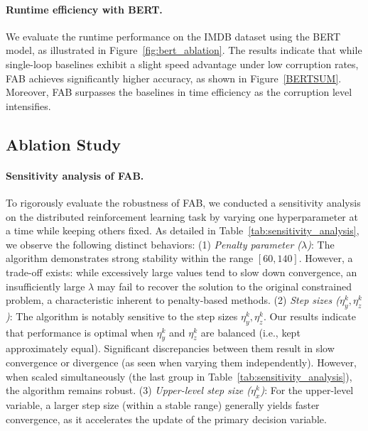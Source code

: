 \documentclass{article}
\theoremstyle{plain}
\theoremstyle{definition}
\theoremstyle{remark}
\begin{document}
\paragraph{Runtime efficiency with BERT.}
We evaluate the runtime performance on the IMDB dataset using the BERT model, as illustrated in Figure~\ref{fig:bert_ablation}.
The results indicate that while single-loop baselines exhibit a slight speed advantage under low corruption rates, FAB achieves significantly higher accuracy, as shown in Figure~\ref{BERTSUM}. Moreover, FAB surpasses the baselines in time efficiency as the corruption level intensifies.





\subsection{Ablation Study}
\label{app:extra_ablation}



\paragraph{Sensitivity analysis of FAB.} 
To rigorously evaluate the robustness of FAB, we conducted a sensitivity analysis on the distributed reinforcement learning task by varying one hyperparameter at a time while keeping others fixed. As detailed in Table~\ref{tab:sensitivity_analysis}, we observe the following distinct behaviors:
(1) \textit{Penalty parameter ($\lambda$)}: The algorithm demonstrates strong stability within the range $[60, 140]$. However, a trade-off exists: while excessively large values tend to slow down convergence, an insufficiently large $\lambda$ may fail to recover the solution to the original constrained problem, a characteristic inherent to penalty-based methods.
(2) \textit{ Step sizes ($\eta_y^k, \eta_z^k$)}: The algorithm is notably sensitive to the step sizes $\eta_y^k, \eta_z^k$. Our results indicate that performance is optimal when $\eta_y^k$ and $\eta_z^k$ are balanced (i.e., kept approximately equal). Significant discrepancies between them result in slow convergence or divergence (as seen when varying them independently). However, when scaled simultaneously (the last group in Table~\ref{tab:sensitivity_analysis}), the algorithm remains robust.
(3) \textit{  Upper-level step size ($\eta_x^k$)}: For the upper-level variable, a larger step size (within a stable range) generally yields faster convergence, as it accelerates the update of the primary decision variable.
\end{document}
